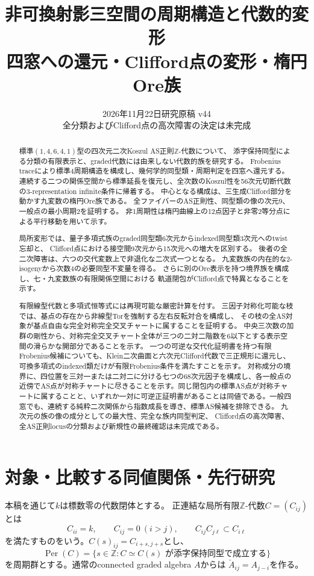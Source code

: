 \documentclass[11pt,a4paper]{ltjsarticle}
\title{非可換射影三空間の周期構造と代数的変形\\
\large 四窓への還元・Clifford点の変形・楕円Ore族}
\author{}
\date{2026年11月22日\quad 研究原稿 v44\\
\small 全分類およびClifford点の高次障害の決定は未完成}
\theoremstyle{definition}
\newcommand{\ZZ}{\mathbb Z}
\newcommand{\Per}{\operatorname{Per}}
\begin{document}
\maketitle
\begin{abstract}
標準$(1,4,6,4,1)$型の四次元二次Koszul AS正則$\ZZ$-代数について、
添字保持同型による分類の有限表示と、graded代数には由来しない代数的族を研究する。
Frobenius traceにより標準4周期構造を構成し、幾何学的同型類・周期判定を四窓へ還元する。
連続する二つの関係空間から標準延長を復元し、全次数のKoszul性を56次元切断代数の3-representation infinite条件に帰着する。
中心となる構成は、三生成Clifford部分を動かす九変数の楕円Ore族である。
全ファイバーのAS正則性、同型類の像の次元9、一般点の最小周期2を証明する。
非1周期性は楕円曲線上の12点因子と非零2等分点による平行移動を用いて示す。

局所変形では、量子多項式族のgraded同型類6次元からindexed同型類3次元へのtwist忘却と、
Clifford点における接空間9次元から15次元への増大を区別する。
後者の全二次障害は、六つの交代変数上で非退化な二次式一つとなる。
九変数族の内在的な2-isogenyから次数4の必要同型不変量を得る。
さらに別のOre表示を持つ境界族を構成し、七・九変数族の有限関係空間における
軌道閉包がClifford点で特異となることを示す。

有限線型代数と多項式恒等式には再現可能な厳密計算を付す。
三因子対称化可能な枝では、基点の存在から非線型Torを強制する左右反転対合を構成し、
その枝の全AS対象が基点自由な完全対称完全交叉チャートに属することを証明する。
中央三次数の加群の剛性から、対称完全交叉チャート全体が三つの二対二階数を6以下とする表示空間の滑らかな開部分であることを示す。
一つの可逆な交代化証明書を持つ有限Frobenius候補についても、Klein二次曲面と六次元Clifford代数で三正規形に還元し、
可換多項式のindexed類だけが有限Frobenius条件を満たすことを示す。
対称成分の境界に、四位置を三対一または二対二に分ける七つの68次元因子を構成し、各一般点の近傍でAS点が対称チャートに尽きることを示す。同じ閉包内の標準AS点が対称チャートに属することと、いずれか一対に可逆正証明書があることは同値である。一般四窓でも、連続する純粋二次関係から指数成長を導き、標準AS候補を排除できる。
九次元の族の像の成分としての最大性、完全な族内同型判定、
Clifford点の高次障害、全AS正則locusの分類および新規性の最終確認は未完成である。
\end{abstract}
\tableofcontents

\section{対象・比較する同値関係・先行研究}
本稿を通じて$k$は標数零の代数閉体とする。
正連結な局所有限$\ZZ$-代数$C=(C_{ij})$とは
\[
 C_{ii}=k,\qquad C_{ij}=0\ (i>j),\qquad C_{ij}C_{j\ell}\subset C_{i\ell}
\]
を満たすものをいう。$C(s)_{ij}=C_{i+s,j+s}$とし、
\[
 \Per(C)=\{s\in\ZZ:C\simeq C(s)\text{ が添字保持同型で成立する}\}
\]
を周期群とする。通常のconnected graded algebra $A$からは
$\check A_{ij}=A_{j-i}$を作る。
\end{document}
